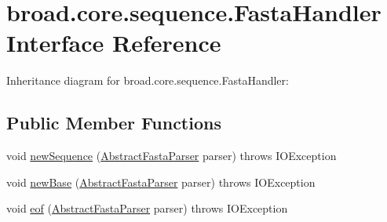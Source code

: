 \hypertarget{interfacebroad_1_1core_1_1sequence_1_1_fasta_handler}{\section{broad.\+core.\+sequence.\+Fasta\+Handler Interface Reference}
\label{interfacebroad_1_1core_1_1sequence_1_1_fasta_handler}
}


Inheritance diagram for broad.\+core.\+sequence.\+Fasta\+Handler\+:
\subsection*{Public Member Functions}
\begin{DoxyCompactItemize}
\item 
void \hyperlink{interfacebroad_1_1core_1_1sequence_1_1_fasta_handler_a47488036e71c24195b8fe2c5d3d5ffee}{new\+Sequence} (\hyperlink{classbroad_1_1core_1_1sequence_1_1_abstract_fasta_parser}{Abstract\+Fasta\+Parser} parser)  throws I\+O\+Exception  
\item 
void \hyperlink{interfacebroad_1_1core_1_1sequence_1_1_fasta_handler_a4878af7a2ee8b1618b9a7e9224099571}{new\+Base} (\hyperlink{classbroad_1_1core_1_1sequence_1_1_abstract_fasta_parser}{Abstract\+Fasta\+Parser} parser)  throws I\+O\+Exception
\item 
void \hyperlink{interfacebroad_1_1core_1_1sequence_1_1_fasta_handler_aabe210527dcc09a072a3e41d21c4ccab}{eof} (\hyperlink{classbroad_1_1core_1_1sequence_1_1_abstract_fasta_parser}{Abstract\+Fasta\+Parser} parser)  throws I\+O\+Exception 
\end{DoxyCompactItemize}


